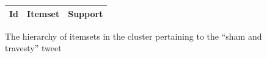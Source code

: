 \documentclass[letterpaper,12pt,titlepage,oneside,final]{book}
\begin{document}
\begin{landscape}
\begin{figure}
\begin{tabular}{p{0.8cm}p{17.5cm}p{2cm}}
Id & Itemset &  Support\\ \hline
\end{tabular}
\caption{The hierarchy of itemsets in the cluster pertaining to the ``sham and travesty'' tweet}
\label{fig:hierSham}
\end{figure}
\end{landscape}
\end{document}
